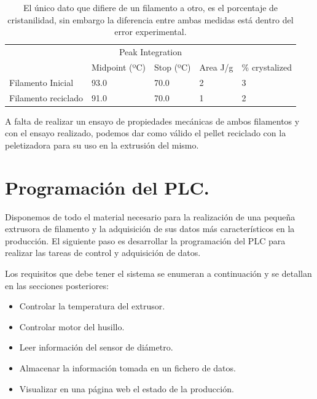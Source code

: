 \begin{table}[H]
    \centering
    \begin{tabular}{lllll}
        \multicolumn{5}{c}{Peak Integration}                                                                                 \\
                             & Midpoint (ºC) & Stop (ºC) & Area J/g   &  \% crystalized \\ \hline
        Filamento Inicial    & 93.0         & 70.0     & 2   &  3                         \\
        Filamento reciclado  & 91.0        & 70.0     & 1    & 2                        
    \end{tabular}
    \caption[Datos del DSC con la cristanilidad del filamento]{El único dato que difiere de un filamento a otro, es el porcentaje de cristanilidad, sin embargo la diferencia entre ambas medidas está dentro del error experimental.}
    \label{tab:dsc2}
\end{table}

A falta de realizar un ensayo de propiedades mecánicas de ambos filamentos y con el ensayo realizado, podemos dar como válido el pellet reciclado con la peletizadora para su uso en la extrusión del mismo.

\section{Programación del PLC.}

Disponemos de todo el material necesario para la realización de una pequeña extrusora de filamento y la adquisición de sus datos más característicos en la producción. El siguiente paso es desarrollar la programación del PLC para realizar las tareas de control y adquisición de datos.

Los requisitos que debe tener el sistema se enumeran a continuación y se detallan en las secciones posteriores:

\begin{itemize}
    \item{Controlar la temperatura del extrusor.}
    \item{Controlar motor del husillo.}
    \item{Leer información del sensor de diámetro.}
    \item{Almacenar la información tomada en un fichero de datos.}
    \item{Visualizar en una página web el estado de la producción.}
\end{itemize}

